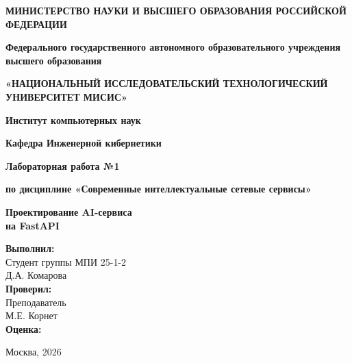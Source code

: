 \documentclass[12pt,a4paper]{article}
\begin{document}
\begin{titlepage}
    \begin{center}
        \textbf{МИНИСТЕРСТВО НАУКИ И ВЫСШЕГО ОБРАЗОВАНИЯ РОССИЙСКОЙ ФЕДЕРАЦИИ}
        \vspace{0.5cm}

        \textbf{Федерального государственного автономного образовательного учреждения \\ высшего образования}
        \vspace{0.3cm}

        \textbf{«НАЦИОНАЛЬНЫЙ ИССЛЕДОВАТЕЛЬСКИЙ ТЕХНОЛОГИЧЕСКИЙ УНИВЕРСИТЕТ МИСИС»}
        \vspace{2cm}

        \textbf{Институт компьютерных наук}
        \vspace{0.3cm}

        \textbf{Кафедра Инженерной кибернетики}
        \vspace{1cm}

        \textbf{Лабораторная работа №1}
        \vspace{0.3cm}

        \textbf{по дисциплине «Современные интеллектуальные сетевые сервисы»}
        \vspace{1.5cm}

        \huge{\textbf{Проектирование AI-сервиса \\ на FastAPI}}
        \vspace{2cm}
    \end{center}

    \begin{flushright}
        \textbf{Выполнил:} \\
        Студент группы МПИ 25-1-2\\
        Д.А. Комарова \\
        \vspace{0.5cm}
        \textbf{Проверил:} \\
        Преподаватель \\
        М.Е. Корнет \\
        \vspace{2cm}
        \textbf{Оценка:} \hrulefill
    \end{flushright}

    \begin{center}
        \vfill
        Москва, 2026
    \end{center}
\end{titlepage}
\end{document}
